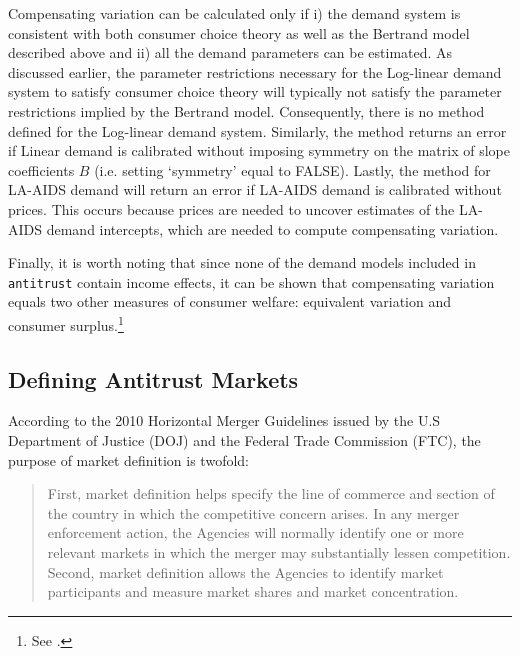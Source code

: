 \documentclass[11pt,numbers=noenddot,pointlessnumbers]{scrreprt}
\newcommand{\atr}{{\tt antitrust}}
\numberwithin{equation}{section}
\begin{document}
Compensating variation can be calculated only if i) the
demand system is consistent with both consumer choice theory as well
as the Bertrand model described above and ii) all the
demand parameters can be estimated. As discussed earlier, the
parameter restrictions necessary for the Log-linear demand system
to satisfy consumer choice theory will typically not satisfy the
parameter restrictions implied by the Bertrand model. Consequently,
there is no \verb@CV@ method defined for the Log-linear demand
system. Similarly, the \verb@CV@ method returns an error if Linear
demand is calibrated without imposing symmetry on the matrix of slope
coefficients $B$ (i.e. setting `symmetry' equal to FALSE). Lastly,
the \verb@CV@ method for LA-AIDS demand will return an error if LA-AIDS
demand is calibrated without prices. This occurs because prices are
needed to uncover estimates of the LA-AIDS demand intercepts, which are
needed to compute compensating variation.

Finally, it is worth noting that since none of the demand models
included in \atr{} contain income effects, it can be shown that compensating variation
equals two other measures of consumer welfare: equivalent variation
and consumer surplus.\footnote{See \cite{Willig1976}.}

\subsection{Defining Antitrust Markets}

According to the 2010 Horizontal Merger Guidelines issued by the U.S
Department of Justice (DOJ) and the Federal Trade Commission (FTC),
the purpose of market definition is twofold:

\begin{quote}
First, market definition helps specify the line of commerce and section of
the country in which the competitive concern arises. In any merger
enforcement action, the Agencies will normally identify one
or more relevant markets in which the merger may substantially lessen
competition. Second, market definition allows the Agencies to identify market participants and
measure market shares and market concentration. \cite[p.~7]{HMG2010}
\end{quote}
\end{document}
